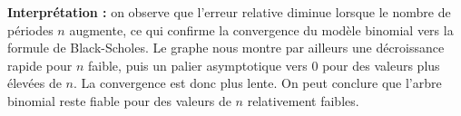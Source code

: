 \documentclass[a4paper,11pt]{article}
\begin{document}
\textbf{Interprétation :} on observe que l'erreur relative diminue lorsque le nombre de périodes $n$ augmente, ce qui confirme la convergence du modèle binomial vers la formule de Black-Scholes. Le graphe nous montre par ailleurs une décroissance rapide pour $n$ faible, puis un palier asymptotique vers 0 pour des valeurs plus élevées de $n$. La convergence est donc plus lente. On peut conclure que l'arbre binomial reste fiable pour des valeurs de $n$ relativement faibles.
\end{document}

